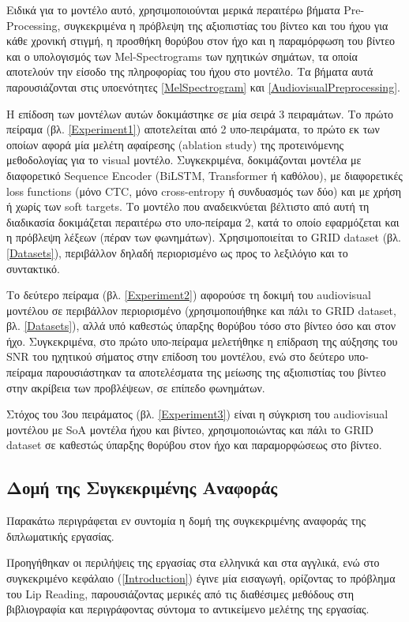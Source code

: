 Ειδικά για το μοντέλο αυτό, χρησιμοποιούνται μερικά περαιτέρω βήματα Pre-Processing, συγκεκριμένα η πρόβλεψη της αξιοπιστίας του βίντεο και του ήχου για κάθε χρονική στιγμή, η προσθήκη θορύβου στον ήχο και η παραμόρφωση του βίντεο και ο υπολογισμός των Mel-Spectrograms των ηχητικών σημάτων, τα οποία αποτελούν την είσοδο της πληροφορίας του ήχου στο μοντέλο. Τα βήματα αυτά παρουσιάζονται στις υποενότητες \ref{MelSpectrogram} και \ref{AudiovisualPreprocessing}.

Η επίδοση των μοντέλων αυτών δοκιμάστηκε σε μία σειρά 3 πειραμάτων. Το πρώτο πείραμα (βλ. \ref{Experiment1}) αποτελείται από 2 υπο-πειράματα, το πρώτο εκ των οποίων αφορά μία μελέτη αφαίρεσης (ablation study) της προτεινόμενης μεθοδολογίας για το visual μοντέλο. Συγκεκριμένα, δοκιμάζονται μοντέλα με διαφορετικό Sequence Encoder (BiLSTM, Transformer ή καθόλου), με διαφορετικές loss functions (μόνο CTC, μόνο cross-entropy ή συνδυασμός των δύο) και με χρήση ή χωρίς των soft targets. Το μοντέλο που αναδεικνύεται βέλτιστο από αυτή τη διαδικασία δοκιμάζεται περαιτέρω στο υπο-πείραμα 2, κατά το οποίο εφαρμόζεται και η πρόβλεψη λέξεων (πέραν των φωνημάτων). Χρησιμοποιείται το GRID dataset (βλ. \ref{Datasets}), περιβάλλον δηλαδή περιορισμένο ως προς το λεξιλόγιο και το συντακτικό.

Το δεύτερο πείραμα (βλ. \ref{Experiment2}) αφορούσε τη δοκιμή του audiovisual μοντέλου σε περιβάλλον περιορισμένο (χρησιμοποιήθηκε και πάλι το GRID dataset, βλ. \ref{Datasets}), αλλά υπό καθεστώς ύπαρξης θορύβου τόσο στο βίντεο όσο και στον ήχο. Συγκεκριμένα, στο πρώτο υπο-πείραμα μελετήθηκε η επίδραση της αύξησης του SNR του ηχητικού σήματος στην επίδοση του μοντέλου, ενώ στο δεύτερο υπο-πείραμα παρουσιάστηκαν τα αποτελέσματα της μείωσης της αξιοπιστίας του βίντεο στην ακρίβεια των προβλέψεων, σε επίπεδο φωνημάτων.

Στόχος του 3ου πειράματος (βλ. \ref{Experiment3}) είναι η σύγκριση του audiovisual μοντέλου με SoA μοντέλα ήχου και βίντεο, χρησιμοποιώντας και πάλι το GRID dataset σε καθεστώς ύπαρξης θορύβου στον ήχο και παραμορφώσεως στο βίντεο. 

\subsection{Δομή της Συγκεκριμένης Αναφοράς}

Παρακάτω περιγράφεται εν συντομία η δομή της συγκεκριμένης αναφοράς της διπλωματικής εργασίας.

Προηγήθηκαν οι περιλήψεις της εργασίας στα ελληνικά και στα αγγλικά, ενώ στο συγκεκριμένο κεφάλαιο (\ref{Introduction}) έγινε μία εισαγωγή, ορίζοντας το πρόβλημα του Lip Reading, παρουσιάζοντας μερικές από τις διαθέσιμες μεθόδους στη βιβλιογραφία και περιγράφοντας σύντομα το αντικείμενο μελέτης της εργασίας.

